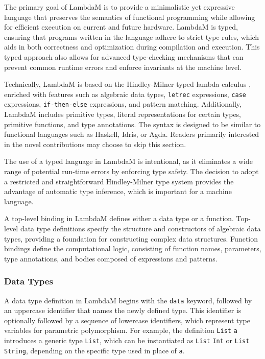 \documentclass{IEEEtran}
\begin{document}
\par The primary goal of LambdaM is to provide a minimalistic yet expressive language that preserves the semantics of functional programming while allowing for efficient execution on current and future hardware. LambdaM is typed, ensuring that programs written in the language adhere to strict type rules, which aids in both correctness and optimization during compilation and execution. This typed approach also allows for advanced type-checking mechanisms that can prevent common runtime errors and enforce invariants at the machine level.

\par Technically, LambdaM is based on the Hindley-Milner typed lambda calculus \cite{Hindley}\cite{Milner}, enriched with features such as algebraic data types, \texttt{letrec} expressions, \texttt{case} expressions, \texttt{if-then-else} expressions, and pattern matching. Additionally, LambdaM includes primitive types, literal representations for certain types, primitive functions, and type annotations. The syntax is designed to be similar to functional languages such as Haskell, Idris, or Agda. Readers primarily interested in the novel contributions may choose to skip this section.

\par The use of a typed language in LambdaM is intentional, as it eliminates a wide range of potential run-time errors by enforcing type safety. The decision to adopt a restricted and straightforward Hindley-Milner type system provides the advantage of automatic type inference, which is important for a machine language.

\par A top-level binding in LambdaM defines either a data type or a function. Top-level data type definitions specify the structure and constructors of algebraic data types, providing a foundation for constructing complex data structures. Function bindings define the computational logic, consisting of function names, parameters, type annotations, and bodies composed of expressions and patterns.

\subsubsection{Data Types}

\par A data type definition in LambdaM begins with the \verb!data! keyword, followed by an uppercase identifier that names the newly defined type. This identifier is optionally followed by a sequence of lowercase identifiers, which represent type variables for parametric polymorphism. For example, the definition \verb!List! \verb!a! introduces a generic type \verb!List!, which can be instantiated as \verb!List! \verb!Int! or \verb!List! \verb!String!, depending on the specific type used in place of \verb!a!.
\end{document}
